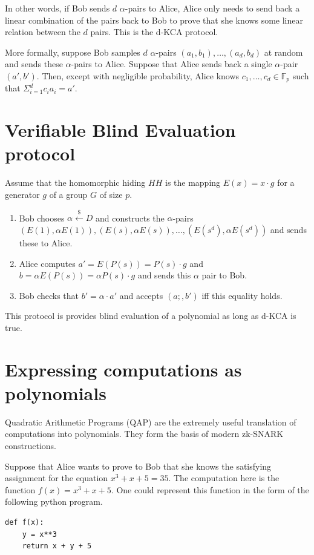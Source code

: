 \documentclass[twoside]{article}
\begin{document}
In other words, if Bob sends $d$ $\alpha$-pairs to Alice, Alice only needs to send back a linear combination of the pairs back to Bob 
to prove that she knows some linear relation between the $d$ pairs. This is the d-KCA protocol. 

More formally, suppose Bob samples $d$ $\alpha$-pairs $(a_1, b_1), \ldots, (a_d, b_d)$ at random and sends these $\alpha$-pairs to Alice.
Suppose that Alice sends back a single $\alpha$-pair $(a', b')$. Then, except with negligible probability, Alice knows 
$c_1, \ldots, c_d \in \mathbb{F}_p$ such that $\Sigma_{i=1}^{d} c_ia_i = a'$.


\section{Verifiable Blind Evaluation protocol}
Assume that the homomorphic hiding $HH$ is the mapping $E(x) = x \cdot g$ for a generator $g$ of a group $G$ of size $p$.
\begin{enumerate}
\item Bob chooses $\alpha \xleftarrow{\$} D$ and constructs the $\alpha$-pairs 
$(E(1), \alpha E(1)), (E(s), \alpha E(s)), \ldots, (E(s^d), \alpha E(s^d))$ and sends these to Alice.
\item Alice computes $a' = E(P(s)) = P(s) \cdot g$ and $b = \alpha E(P(s)) = \alpha P(s) \cdot g$ and sends this $\alpha$ pair
to Bob.
\item Bob checks that $b' = \alpha \cdot a'$ and accepts $(a;, b')$ iff this equality holds.
\end{enumerate}

This protocol is provides blind evaluation of a polynomial as long as d-KCA is true.

\section{Expressing computations as polynomials}
Quadratic Arithmetic Programs (QAP) are the extremely useful translation of computations into polynomials. They form the basis
of modern zk-SNARK constructions.

Suppose that Alice wants to prove to Bob that she knows the satisfying assignment for the equation $x^3 + x + 5 = 35$. 
The computation here is the function $f(x) = x^3 + x + 5$. One could represent this function in the form of the following 
python program.
\begin{verbatim}
def f(x):
    y = x**3
    return x + y + 5
\end{verbatim}
\end{document}
